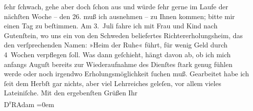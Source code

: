 \begin{ledgroupsized}[t]{13cm}
               ſehr ſchwach, gehe aber doch ſchon aus und würde ſehr gerne {\pb}im Laufe der nächſten Woche – den
                  26. muß ich ausnehmen – zu Ihnen kommen; bitte mir einen Tag zu
               beſtimmen.\pend
           \pstart
           Am 3. Juli fahre ich mit Frau und Kind nach Gutenſtein,
               wo uns ein von den Schweden beliefertes
               Richtererholungsheim, das den verſprechenden Namen: »Heim der Ruhe« führt, für wenig Geld durch 4 Wochen verpflegen ſoll. Was
               dann geſchieht, hängt davon ab, ob ich mich anfangs Auguſt bereits zur
               Wiederaufnahme des Dienſtes ſtark genug fühlen werde oder noch irgendwo
               Erholungsmöglichkeit ſuchen muß.\pend
           \pstart
           Gearbeitet habe ich ſeit dem Herbſt gar nichts, aber viel
               Lehrreiches geleſen, vor allem vieles Lateiniſche.\pend
           \pstart
           {\pb}Mit den ergebenſten Grüßen\pend
           \pstart
           Ihr{\\[\baselineskip]}\spacefill\mbox{D\textsuperscript{r}RAdam}\pend
           \leftskip=0em{}
         
         \endnumbering{}\end{ledgroupsized}  \newcommand{\dateiname}{L02343}\newcommand{\titel}{Robert Adam an Arthur Schnitzler, 17. 6. 1920}\newcommand{\editorInnen}{Martin Anton Müller und Gerd-Hermann Susen}
      